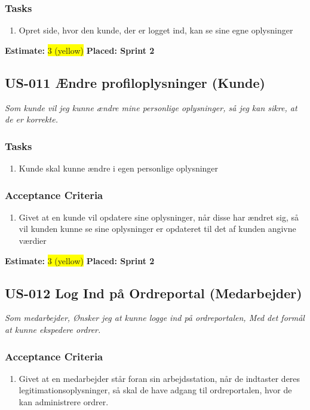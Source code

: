 \subsubsection*{\textbf{Tasks}}
\begin{enumerate}
  \item Opret side, hvor den kunde, der er logget ind, kan se sine egne oplysninger
\end{enumerate}
\textbf{Estimate:} \colorbox{yellow}{3 (yellow)}
\textbf{Placed: Sprint 2}
\par\noindent\dotfill

\subsection{US-011 Ændre profiloplysninger (Kunde)}
\label{sec:US-011}
\textit{Som kunde vil jeg kunne ændre mine personlige oplysninger, så jeg kan sikre, at de er korrekte.}
\subsubsection*{\textbf{Tasks}}
\begin{enumerate}
  \item Kunde skal kunne ændre i egen personlige oplysninger
\end{enumerate}
\subsubsection*{\textbf{Acceptance Criteria}}
\begin{enumerate}
  \item Givet at en kunde vil opdatere sine oplysninger, når disse har ændret sig, så vil kunden kunne se sine oplysninger er opdateret til det af kunden angivne værdier
\end{enumerate}
\textbf{Estimate:} \colorbox{yellow}{3 (yellow)}
\textbf{Placed: Sprint 2}
\par\noindent\dotfill

\subsection{US-012 Log Ind på Ordreportal (Medarbejder)}
\label{sec:US-012}
\textit{Som medarbejder, Ønsker jeg at kunne logge ind på ordreportalen, Med det formål at kunne ekspedere ordrer.}
\subsubsection*{\textbf{Acceptance Criteria}}
\begin{enumerate}
  \item Givet at en medarbejder står foran sin arbejdsstation, når de indtaster deres legitimationsoplysninger, så skal de have adgang til ordreportalen, hvor de kan administrere ordrer.
\end{enumerate}
